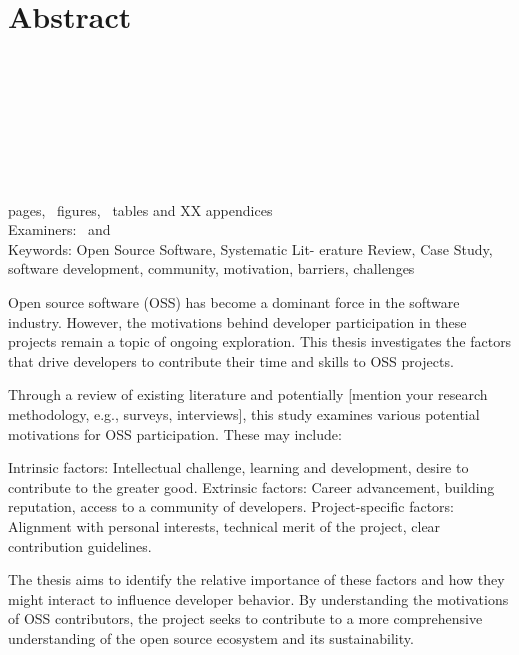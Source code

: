 \section*{Abstract}
\begin{spacing}{1.5}
\university\\
\school\\
\degreeprogramme\\
\end{spacing}

\myname

\textbf{\mytitle}\\
\mysubtitle

\begin{spacing}{1.5}
\thesistype\\
\thesisyear\\
\pageref{myLastPage} pages, \totalfigures~figures, \totaltables~tables and XX appendices\\
Examiners: \examinerA~and \examinerB\\
Keywords: Open Source Software, Systematic Lit-
erature Review, Case Study, software
development, community, motivation,  barriers, challenges
\end{spacing}

\vspace{1em}
\begin{spacing}{1.0}

Open source software (OSS) has become a dominant force in the software industry. However, the motivations behind developer participation in these projects remain a topic of ongoing exploration. This thesis investigates the factors that drive developers to contribute their time and skills to OSS projects.

Through a review of existing literature and potentially [mention your research methodology, e.g., surveys, interviews], this study examines various potential motivations for OSS participation. These may include:

Intrinsic factors: Intellectual challenge, learning and development, desire to contribute to the greater good.
Extrinsic factors: Career advancement, building reputation, access to a community of developers.
Project-specific factors: Alignment with personal interests, technical merit of the project, clear contribution guidelines.

The thesis aims to identify the relative importance of these factors and how they might interact to influence developer behavior. By understanding the motivations of OSS contributors, the project seeks to contribute to a more comprehensive understanding of the open source ecosystem and its sustainability.

\end{spacing}
\clearpage %
